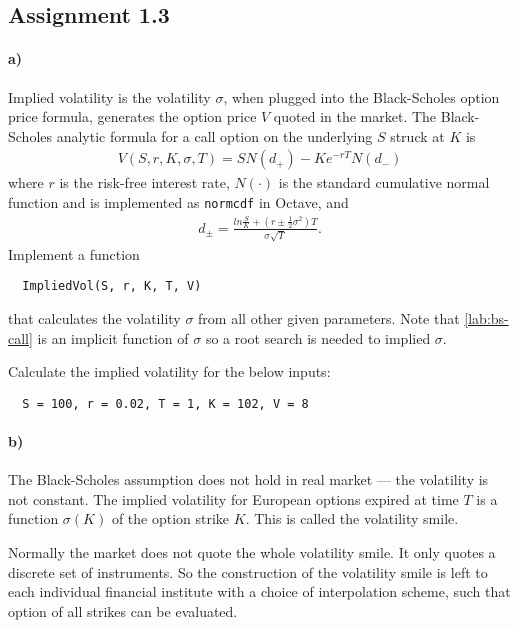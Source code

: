 \documentclass[11pt,a4paper,hidelinks,fleqn]{article}            %
\begin{document}
\subsection*{Assignment 1.3}

\paragraph{a)} Implied volatility is the volatility $\sigma$,
when plugged into the Black-Scholes option price formula, 
generates the option price $V$ quoted in the market.
The Black-Scholes analytic formula for a call option on the underlying $S$ struck at $K$ is
\begin{align}
V(S, r, K, \sigma, T) = S N(d_+) - K e^{-rT} N(d_-)
\label{lab:bs-call}
\end{align}
where $r$ is the risk-free interest rate,
$N(\cdot)$ is the standard cumulative normal function and is implemented as \verb=normcdf= in Octave, and
\begin{align*}
d_{\pm} = \frac{ln\frac{S}{K} + (r \pm \frac{1}{2}\sigma^2)T}{\sigma\sqrt{T}}.
\end{align*}
Implement a function 
\begin{verbatim}
  ImpliedVol(S, r, K, T, V)
\end{verbatim}
that calculates the volatility $\sigma$ from all other given parameters.
Note that \eqref{lab:bs-call} is an implicit function of $\sigma$ so a root search is needed to implied $\sigma$.

Calculate the implied volatility for the below inputs: \vspace{-0.5cm}
\begin{verbatim}
  S = 100, r = 0.02, T = 1, K = 102, V = 8
\end{verbatim}

\paragraph{b)} The Black-Scholes assumption does not hold in real market 
--- the volatility is not constant.
The implied volatility for European options expired at time $T$ 
is a function $\sigma(K)$ of the option strike $K$.
This is called the volatility smile.

Normally the market does not quote the whole volatility smile.
It only quotes a discrete set of instruments.
So the construction of the volatility smile is left to each individual financial institute 
with a choice of interpolation scheme, such that option of all strikes can be evaluated.
\end{document}
